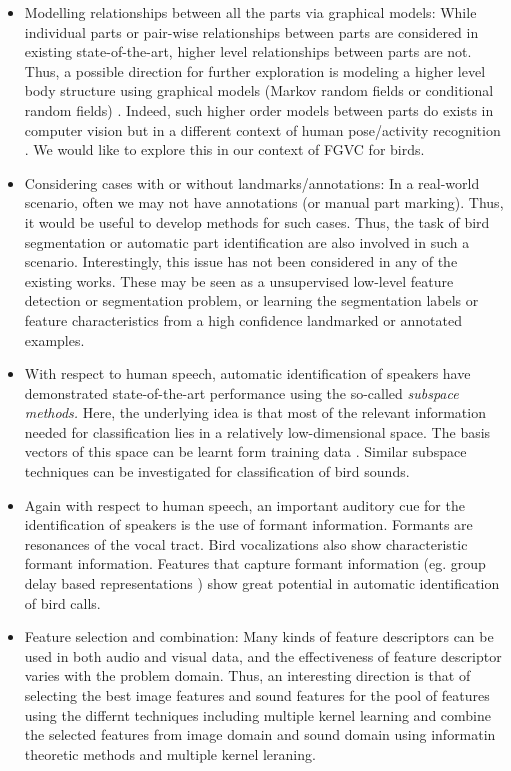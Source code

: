 \documentclass{article}
\begin{document}
\begin{itemize}
\item Modelling relationships between all the parts via graphical models: While individual parts or pair-wise relationships between parts are considered in existing state-of-the-art, higher level relationships between parts are not. Thus, a possible direction for further exploration is modeling a higher level body structure using graphical models (Markov random fields or conditional random fields) \cite{mrfbook,hmrf,mrf,crf,crf1}. Indeed, such higher order models between parts do exists in computer vision but in a different context of human pose/activity recognition \cite{mrfpose}. We would like to explore this in our context of FGVC for birds.
\item Considering cases with or without landmarks/annotations: In a real-world scenario, often we may not have annotations (or manual part marking). Thus, it would be useful to develop methods for such cases. Thus, the task of bird segmentation or automatic part identification are also involved in such a scenario. Interestingly, this issue has not been considered in any of the existing works. These may be seen as a unsupervised low-level feature detection or segmentation problem, or learning the segmentation labels or feature characteristics from a high confidence landmarked or annotated examples.
\item With respect to human speech, automatic identification of speakers have
demonstrated state-of-the-art performance using the so-called \emph{subspace
methods.} Here, the underlying idea is that most of the relevant information
needed for classification 
lies in a relatively low-dimensional space. The basis vectors of this space can
be learnt form training data \cite{dehak_ivector}. Similar subspace techniques
can be investigated for classification of bird sounds.
\item Again with respect to human speech, an important auditory cue for the
identification of speakers is the use of formant information. Formants are
resonances of the vocal tract. Bird vocalizations also show characteristic
formant information. Features that capture formant information (eg. group delay
based representations \cite{padmanAllPoleGDelay, hegdeModgdf}) show great potential in
automatic identification of bird calls.
\item Feature selection and combination: Many kinds of feature descriptors can be used in both audio and visual data, and the effectiveness of feature descriptor varies with the problem domain. Thus, an interesting direction is that of selecting the best image features and sound features for the pool of features using the differnt techniques including multiple kernel learning and combine the selected features from image domain and sound domain using informatin theoretic methods and multiple kernel leraning. 

\end{itemize}
\end{document}
